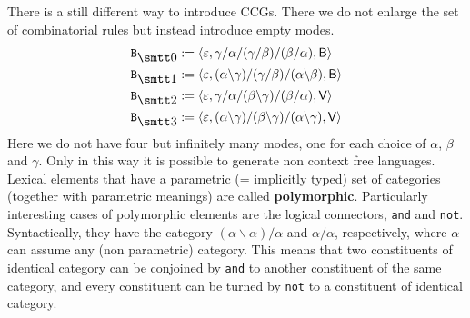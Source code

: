 There is a still different way to introduce CCGs. There we do
not enlarge the set of combinatorial rules but instead introduce
empty modes.
\begin{equation}
\begin{split}
\mbox{\tt B}_{\snull} & := \auf \varepsilon,
   \gamma/\alpha/(\gamma/\beta)/(\beta/\alpha),
   \mathsf{B} \zu \\
\mbox{\tt B}_{\seins} & := \auf \varepsilon,
   (\alpha\backslash \gamma)/(\gamma/\beta)/(\alpha\backslash\beta),
   \mathsf{B}\zu \\
\mbox{\tt B}_{\szwei} & := \auf \varepsilon,
   \gamma/\alpha/(\beta\backslash\gamma)/(\beta/\alpha),
   \mathsf{V}\zu \\
\mbox{\tt B}_{\sdrei} & := \auf \varepsilon,
   (\alpha\backslash \gamma)/(\beta\backslash%
   \gamma)/(\alpha\backslash\gamma),
   \mathsf{V}\zu
\end{split}
\end{equation}
Here we do not have four but infinitely many modes, one for
each choice of $\alpha$, $\beta$ and $\gamma$. Only in this
way it is possible to generate non context free languages.
Lexical elements that have a parametric (= implicitly typed) 
set of categories (together with parametric meanings) are called 
\textbf{polymorphic}. Particularly interesting cases of polymorphic 
elements are the logical connectors, {\tt and} and {\tt not}. 
Syntactically, they have the category $(\alpha\backslash\alpha)/\alpha$ 
and $\alpha/\alpha$, respectively, where $\alpha$ can assume any
(non parametric) category. This means that two constituents
of identical category can be conjoined by {\tt and} to another
constituent of the same category, and every constituent can be
turned by {\tt not} to a constituent of identical category.

